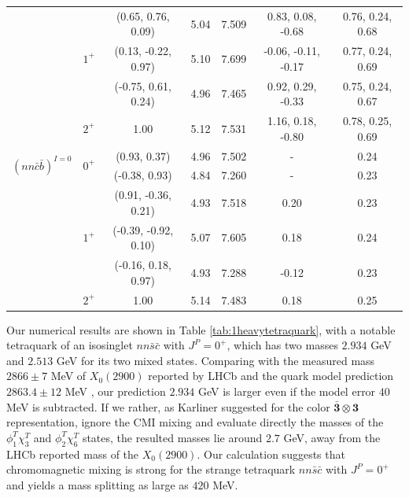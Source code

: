 \documentclass[12pt,prd,onecolumn,floatfix,nofootinbib]{revtex4}
\begin{document}
\begin{table}[!htb]
\begin{tabular}{ccccccc}
& \multirow{3}{*}{$1^{+}$} & (0.65, 0.76, 0.09) & 5.04 & 7.509 & 0.83, 0.08,
-0.68 & 0.76, 0.24, 0.68 \\
&  & (0.13, -0.22, 0.97) & 5.10 & 7.699 & -0.06, -0.11, -0.17 & 0.77, 0.24,
0.69 \\
&  & (-0.75, 0.61, 0.24) & 4.96 & 7.465 & 0.92, 0.29, -0.33 & 0.75, 0.24,
0.67 \\
& $2^{+}$ & 1.00 & 5.12 & 7.531 & 1.16, 0.18, -0.80 & 0.78, 0.25, 0.69 \\
\multirow{2}{*}{${(nn\bar{c}\bar{b})}^{I=0}$} & \multirow{2}{*}{$0^{+}$} &
(0.93, 0.37) & 4.96 & 7.502 & - & 0.24 \\
&  & (-0.38, 0.93) & 4.84 & 7.260 & - & 0.23 \\
& \multirow{3}{*}{$1^{+}$} & (0.91, -0.36, 0.21) & 4.93 & 7.518 & 0.20 & 0.23
\\
&  & (-0.39, -0.92, 0.10) & 5.07 & 7.605 & 0.18 & 0.24 \\
&  & (-0.16, 0.18, 0.97) & 4.93 & 7.288 & -0.12 & 0.23 \\
& $2^{+}$ & 1.00 & 5.14 & 7.483 & 0.18 & 0.25 \\ \hline\hline
\end{tabular}%
\end{table}

Our numerical results are shown in Table \ref{tab:1heavytetraquark}, with a
notable tetraquark of an isosinglet $nn\bar{s}\bar{c}$ with $J^{P}=0^{+}$,
which has two masses $2.934$ GeV and $2.513$ GeV for its two mixed states.
Comparing with the measured mass $2866\pm 7$ MeV of $X_{0}(2900)$ reported
by LHCb\cite{LHCb:2020kd} and the quark model prediction $2863.4\pm 12$ MeV%
\cite{Karliner:2020vsi}, our prediction $2.934$ GeV is larger even if the
model error $40$ MeV is subtracted. If we rather, as Karliner suggested for
the color $\boldsymbol{\bar{3}}\otimes \boldsymbol{3}$ representation, ignore
the CMI mixing and evaluate directly the masses of the $\phi _{1}^{T}\chi
_{3}^{T}$ and $\phi _{2}^{T}\chi _{6}^{T}$ states, the resulted masses lie
around $2.7$ GeV, away from the LHCb reported mass of the $X_{0}(2900)$. Our
calculation suggests that chromomagnetic mixing is strong for the strange
tetraquark $nn\bar{s}\bar{c}$ with $J^{P}=0^{+}$ and yields a mass splitting
as large as $420$ MeV.
\end{document}

